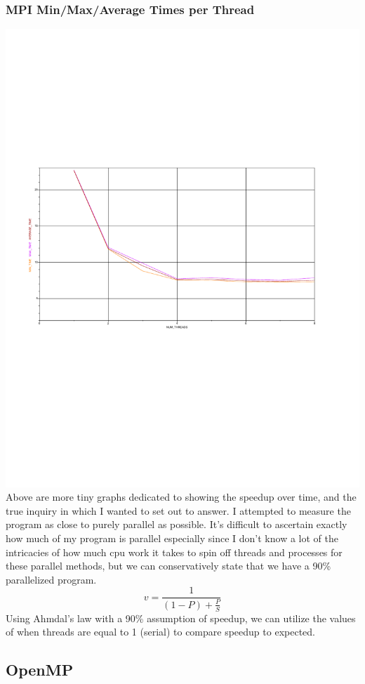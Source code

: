 \documentclass{article}
\begin{document}
\subsubsection*{MPI Min/Max/Average Times per Thread}
\includegraphics[scale=0.5]{images/mpi_times.pdf}\\
Above are more tiny graphs dedicated to showing the speedup over time, and the true inquiry in which I wanted to set out to answer. I attempted to measure the program as close to purely parallel as possible. It's difficult to ascertain exactly how much of my program is parallel especially since I don't know a lot of the intricacies of how much cpu work it takes to spin off threads and processes for these parallel methods, but we can conservatively state that we have a 90\% parallelized program.\\
$$v=\frac{1}{(1-P)+\frac{P}{S}}$$
Using Ahmdal's law with a 90\% assumption of speedup, we can utilize the values of when threads are equal to 1 (serial) to compare speedup to expected.
\subsection*{OpenMP}
\end{document}
